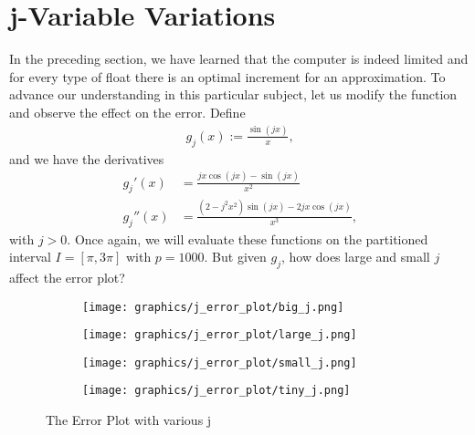 \section{j-Variable Variations}

In the preceding section, we have learned that the computer is indeed limited and for every type of float there is an optimal increment for an approximation. To advance our understanding in this particular subject, let us modify the function and observe the effect on the error. Define
\begin{align*}
    g_j(x) := \frac{\sin(j x)}{x} \text{,}
\end{align*}
and we have the derivatives
\begin{align*}
    g_j'(x) &= \frac{j x \cos(jx) - \sin(jx)}{x^2} \\
    g_j''(x) &= \frac{(2 - j^2 x^2)\sin(jx) - 2 j x \cos(jx)}{x^3} \text{,}
\end{align*}
with \(j > 0\). Once again, we will evaluate these functions on the partitioned interval \(I = [\pi, 3\pi]\) with \(p = 1000\). But given \(g_j\), how does large and small \(j\) affect the error plot?

\begin{figure}[h!]
    \centering
    \begin{subfigure}[b]{0.49\linewidth}
        \texttt{[image: graphics/j\_error\_plot/big\_j.png]}
    \end{subfigure}
    \begin{subfigure}[b]{0.49\linewidth}
        \texttt{[image: graphics/j\_error\_plot/large\_j.png]}
    \end{subfigure}
    \begin{subfigure}[b]{0.49\linewidth}
        \texttt{[image: graphics/j\_error\_plot/small\_j.png]}
    \end{subfigure}
    \begin{subfigure}[b]{0.49\linewidth}
        \texttt{[image: graphics/j\_error\_plot/tiny\_j.png]}
    \end{subfigure}
    \caption{The Error Plot with various j}
    \label{fig:exp2_j}
\end{figure}

